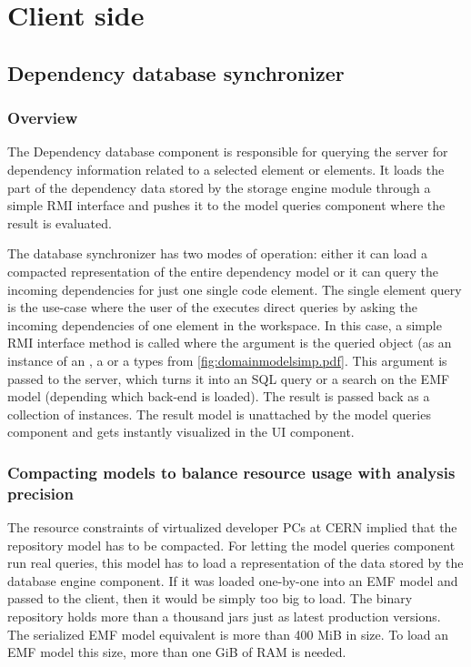 \section{Client side}
\subsection{Dependency database synchronizer}
\label{sect:depdbsynch}

\subsubsection{Overview}
The Dependency database component is responsible for querying the server for
dependency information related to a selected element or elements. It loads the
part of the dependency data stored by the storage engine module through a
simple RMI interface and pushes it to the model queries component where the
result is evaluated.

The database synchronizer has two modes of operation: either it can load a compacted
representation of the entire dependency model or it can query the incoming
dependencies for just one single code element.
The single element query is the use-case where the user of the \ptool{} executes
direct queries by asking the incoming dependencies of one element in the
workspace. In this case, a simple RMI interface method is called where the
argument is the queried object (as an instance of an , a  or a
 types from \autoref{fig:domainmodelsimp.pdf}. This argument is passed to
the server, which turns it into an SQL query or a search on the EMF model
(depending which back-end is loaded). The result is passed back as a collection
of  instances. The result model is unattached by the model
queries component and gets instantly visualized in the UI component.

\subsubsection{Compacting models to balance resource usage with analysis precision}
The resource constraints of virtualized developer PCs at CERN implied that the
repository model has to be compacted. 
For letting the model queries component run real queries, this model has to load
a representation of the data stored by the database engine component. If it was
loaded one-by-one into an EMF model and passed to the client, then it would be
simply too big to load. The binary repository holds more than a thousand jars
just as latest production versions. The serialized EMF model equivalent is more
than 400 MiB in size. To load an EMF model this size, more than one GiB of
RAM is needed.


